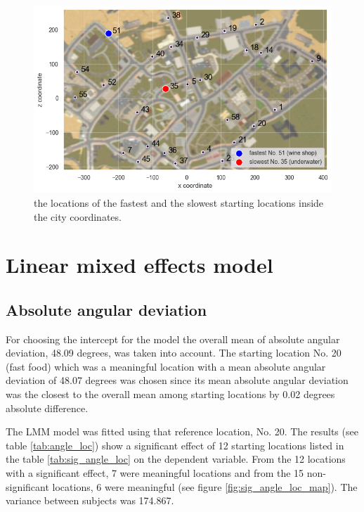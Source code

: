 \begin{figure}[!htb]
	\centering
	\includegraphics[width=140mm]{figures/fastest_slowest_starting_locations_RT_map.png}
	\caption[Locations of fastest and slowest starting locations in city]{the locations of the fastest and the slowest starting locations inside the city coordinates.}
	\label{fig:fastest_slowest_locs}
\end{figure}

\section{Linear mixed effects model}

\subsection{Absolute angular deviation}

For choosing the intercept for the model the overall mean of absolute angular deviation, 48.09 degrees, was taken into account. The starting location No. 20 (fast food) which was a meaningful location with a mean absolute angular deviation of 48.07 degrees was chosen since its mean absolute angular deviation was the closest to the overall mean among starting locations by 0.02 degrees absolute difference.

The LMM model was fitted using that reference location, No. 20. The results (see table \ref{tab:angle_loc}) show a significant effect of 12 starting locations listed in the table \ref{tab:sig_angle_loc} on the dependent variable. From the 12 locations with a significant effect, 7 were meaningful locations and from the 15 non-significant locations, 6 were meaningful (see figure \ref{fig:sig_angle_loc_map}). The variance between subjects was 174.867. 
                                                                                            
